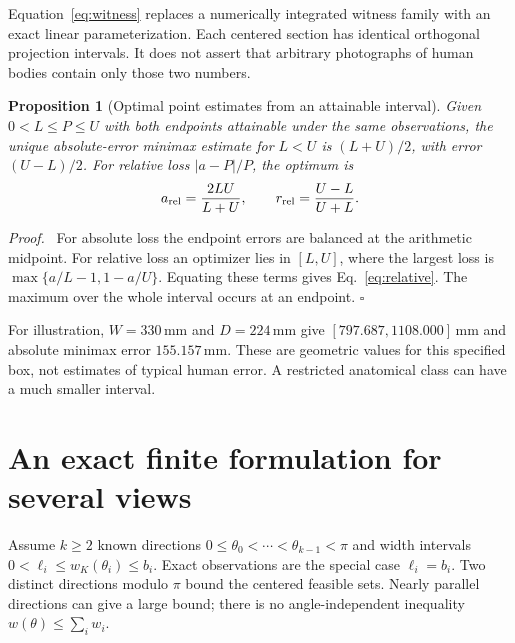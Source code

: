 \documentclass[11pt,a4paper]{article}
\newtheorem{proposition}[theorem]{Proposition}
\newenvironment{proof}{\par\noindent\textit{Proof.}\ }{\hfill$\square$\par\medskip}
\begin{document}
Equation~\eqref{eq:witness} replaces a numerically integrated witness family with an exact linear parameterization. Each centered section has identical orthogonal projection intervals. It does not assert that arbitrary photographs of human bodies contain only those two numbers.

\begin{proposition}[Optimal point estimates from an attainable interval]
\label{prop:minimax}
Given $0<L\le P\le U$ with both endpoints attainable under the same observations, the unique absolute-error minimax estimate for $L<U$ is $(L+U)/2$, with error $(U-L)/2$. For relative loss $|a-P|/P$, the optimum is
\begin{equation}
a_{\rm rel}=\frac{2LU}{L+U},\qquad
r_{\rm rel}=\frac{U-L}{U+L}.
\label{eq:relative}
\end{equation}
\end{proposition}
\begin{proof}
For absolute loss the endpoint errors are balanced at the arithmetic midpoint. For relative loss an optimizer lies in $[L,U]$, where the largest loss is $\max\{a/L-1,1-a/U\}$. Equating these terms gives Eq.~\eqref{eq:relative}. The maximum over the whole interval occurs at an endpoint.
\end{proof}

For illustration, $W=330$\,mm and $D=224$\,mm give $[797.687,1108.000]$\,mm and absolute minimax error $155.157$\,mm. These are geometric values for this specified box, not estimates of typical human error. A restricted anatomical class can have a much smaller interval.

\section{An exact finite formulation for several views}
Assume $k\ge2$ known directions $0\le\theta_0<\cdots<\theta_{k-1}<\pi$ and width intervals $0<\ell_i\le w_K(\theta_i)\le b_i$. Exact observations are the special case $\ell_i=b_i$. Two distinct directions modulo $\pi$ bound the centered feasible sets. Nearly parallel directions can give a large bound; there is no angle-independent inequality $w(\theta)\le\sum_i w_i$.
\end{document}
